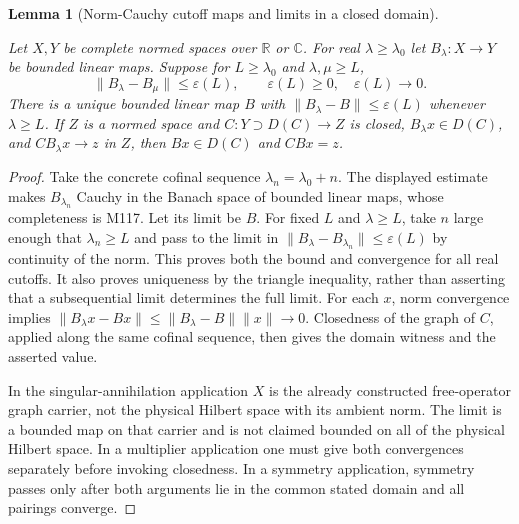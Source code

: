 \documentclass[11pt,a4paper]{article}
\newtheorem{lemma}[theorem]{Lemma}
\theoremstyle{definition}
\theoremstyle{remark}
\newcommand{\proofid}[1]{\par\smallskip{\normalfont\scriptsize\color{inkblue}Stable ID: \nolinkurl{#1}}\par\smallskip}
\begin{document}
\begin{lemma}[Norm-Cauchy cutoff maps and limits in a closed domain]
\label{bridge:cutoff-extension}
\proofid{bridge:cutoff-extension}
\par{}\par\smallskip
Let $X,Y$ be complete normed spaces over $\mathbb R$ or $\mathbb C$.
For real $\lambda\geq\lambda_0$ let $B_\lambda:X\to Y$ be bounded linear
maps. Suppose for $L\geq\lambda_0$ and $\lambda,\mu\geq L$,
\[
 \|B_\lambda-B_\mu\|\leq\varepsilon(L),\qquad
 \varepsilon(L)\geq0,\quad\varepsilon(L)\longrightarrow0.
\]
There is a unique bounded linear map $B$ with
$\|B_\lambda-B\|\leq\varepsilon(L)$ whenever $\lambda\geq L$.
If $Z$ is a normed space and $C:Y\supset D(C)\to Z$ is closed, $B_\lambda x\in D(C)$, and
$CB_\lambda x\to z$ in $Z$, then $Bx\in D(C)$ and $CBx=z$.
\end{lemma}
\begin{proof}
Take the concrete cofinal sequence $\lambda_n=\lambda_0+n$.
The displayed estimate makes $B_{\lambda_n}$ Cauchy in the Banach
space of bounded linear maps, whose completeness is M117. Let its limit
be $B$. For fixed $L$ and $\lambda\geq L$, take $n$ large enough that
$\lambda_n\geq L$ and pass to the limit in
$\|B_\lambda-B_{\lambda_n}\|\leq\varepsilon(L)$ by continuity of the
norm. This proves both the bound and convergence for all real cutoffs.
It also proves uniqueness by the triangle inequality, rather than
asserting that a subsequential limit determines the full limit.
For each $x$, norm convergence implies
$\|B_\lambda x-Bx\|\leq\|B_\lambda-B\|\|x\|\to0$.
Closedness of the graph of $C$, applied along the same cofinal sequence,
then gives the domain witness and the asserted value.

In the singular-annihilation application $X$ is the already constructed
free-operator graph carrier, not the physical Hilbert space with its
ambient norm. The limit is a bounded map on that carrier and is not
claimed bounded on all of the physical Hilbert space. In a multiplier
application one must give both convergences separately before invoking
closedness. In a symmetry application, symmetry passes only after both
arguments lie in the common stated domain and all pairings converge.
\end{proof}
\end{document}
